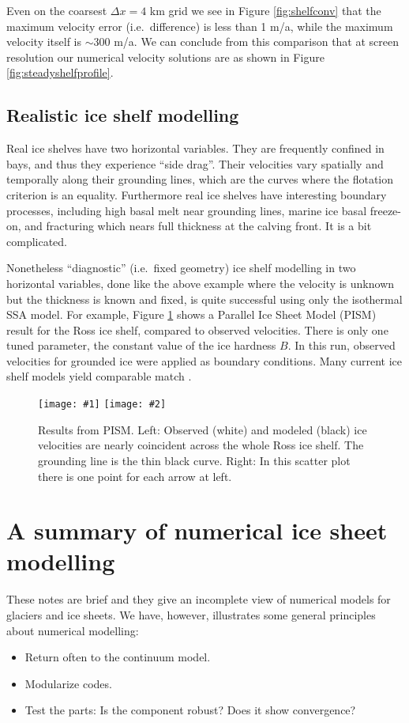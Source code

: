 \documentclass[letterpaper,final,12pt,reqno]{amsart}
\newcommand{\twofigsizes}[5]{
\begin{figure}[ht]
\centering
\texttt{[image: \#1]} \quad
\texttt{[image: \#2]}
\caption{#3}
\label{fig:#1}
\end{figure}}
\begin{document}
Even on the coarsest $\Delta x = 4$ km grid we see in Figure \ref{fig:shelfconv} that the maximum velocity error (i.e.~difference) is less than 1 m/a, while the maximum velocity itself is $\sim 300$ m/a.  We can conclude from this comparison that at screen resolution our numerical velocity solutions are as shown in Figure \ref{fig:steadyshelfprofile}.

\subsection*{Realistic ice shelf modelling}  Real ice shelves have two horizontal variables.  They are frequently confined in bays, and thus they experience ``side drag''.  Their velocities vary spatially and temporally along their grounding lines, which are the curves where the flotation criterion is an equality.  Furthermore real ice shelves have interesting boundary processes, including high basal melt near grounding lines, marine ice basal freeze-on, and fracturing which nears full thickness at the calving front.  It is a bit complicated.

Nonetheless ``diagnostic'' (i.e.~fixed geometry) ice shelf modelling in two horizontal variables, done like the above example where the velocity is unknown but the thickness is known and fixed, is quite successful using only the isothermal SSA model.  For example, Figure \ref{fig:rossquiver} shows a Parallel Ice Sheet Model (PISM) result for the Ross ice shelf, compared to observed velocities.  There is only one tuned parameter, the constant value of the ice hardness $B$.  In this run, observed velocities for grounded ice were applied as boundary conditions.  Many current ice shelf models yield comparable match \cite{MacAyealetal}.

\twofigsizes{rossquiver}{rossscatter}{Results from PISM.  Left: Observed (white) and modeled (black) ice velocities are nearly coincident across the whole Ross ice shelf.  The grounding line is the thin black curve.  Right: In this scatter plot there is one point for each arrow at left.}{3.0in}{3.0in}


\section{A summary of numerical ice sheet modelling} \label{sec:summary}

These notes are brief and they give an incomplete view of numerical models for glaciers and ice sheets.  We have, however, illustrates some general principles about numerical modelling:
\begin{itemize}
\item Return often to the continuum model.
\item Modularize codes.
\item Test the parts: Is the component robust? Does it show convergence?
\end{itemize}
\end{document}
